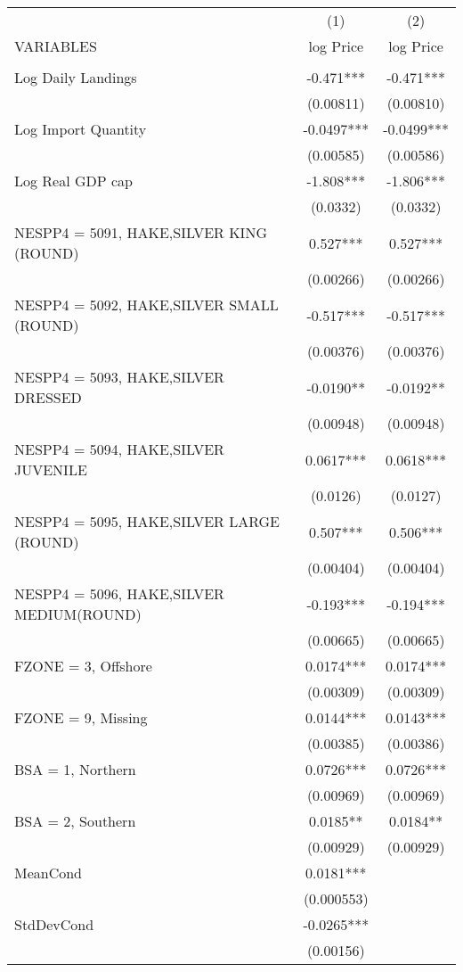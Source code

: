 \begin{tabular}{lcc} \hline
 & (1) & (2) \\
VARIABLES & log Price & log Price \\ \hline
 &  &  \\
Log Daily Landings & -0.471*** & -0.471*** \\
 & (0.00811) & (0.00810) \\
Log Import Quantity & -0.0497*** & -0.0499*** \\
 & (0.00585) & (0.00586) \\
Log Real GDP cap & -1.808*** & -1.806*** \\
 & (0.0332) & (0.0332) \\
NESPP4 = 5091, HAKE,SILVER KING (ROUND) & 0.527*** & 0.527*** \\
 & (0.00266) & (0.00266) \\
NESPP4 = 5092, HAKE,SILVER SMALL (ROUND) & -0.517*** & -0.517*** \\
 & (0.00376) & (0.00376) \\
NESPP4 = 5093, HAKE,SILVER DRESSED & -0.0190** & -0.0192** \\
 & (0.00948) & (0.00948) \\
NESPP4 = 5094, HAKE,SILVER JUVENILE & 0.0617*** & 0.0618*** \\
 & (0.0126) & (0.0127) \\
NESPP4 = 5095, HAKE,SILVER LARGE (ROUND) & 0.507*** & 0.506*** \\
 & (0.00404) & (0.00404) \\
NESPP4 = 5096, HAKE,SILVER MEDIUM(ROUND) & -0.193*** & -0.194*** \\
 & (0.00665) & (0.00665) \\
FZONE = 3, Offshore & 0.0174*** & 0.0174*** \\
 & (0.00309) & (0.00309) \\
FZONE = 9, Missing & 0.0144*** & 0.0143*** \\
 & (0.00385) & (0.00386) \\
BSA = 1, Northern & 0.0726*** & 0.0726*** \\
 & (0.00969) & (0.00969) \\
BSA = 2, Southern & 0.0185** & 0.0184** \\
 & (0.00929) & (0.00929) \\
MeanCond & 0.0181*** &  \\
 & (0.000553) &  \\
StdDevCond & -0.0265*** &  \\
 & (0.00156) &  \\

\end{tabular}
